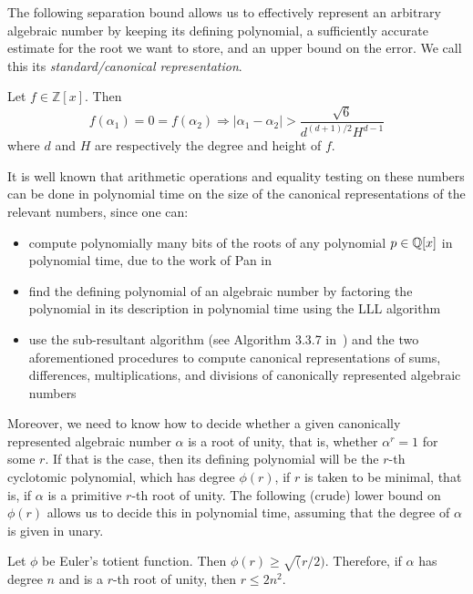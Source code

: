 The following separation bound allows us to effectively represent an arbitrary algebraic number by keeping its defining polynomial, a sufficiently accurate estimate for the root we want to store, and an upper bound on the error. We call this its \emph{standard/canonical representation}.

\begin{lemma}[Mignotte]
Let $f\in\mathbb{Z}[x]$. Then
\begin{equation}
f(\alpha_1)=0=f(\alpha_2)\Rightarrow \lvert \alpha_1-\alpha_2\rvert>\frac{\sqrt{6}}{d^{(d+1)/2}H^{d-1}}
\end{equation}
where $d$ and $H$ are respectively the degree and height of $f$.
\end{lemma}

It is well known that arithmetic operations and equality testing on these numbers can be done in polynomial time on the size of the canonical representations of the relevant numbers, since one can:
\begin{itemize}
\item compute polynomially many bits of the roots of any polynomial $p\in\mathbb{Q}[x]$ in polynomial time, due to the work of Pan in~\cite{Pan97}
\item find the defining polynomial of an algebraic number by factoring the polynomial in its description in polynomial time using the LLL algorithm~\cite{LenstraLenstraLovasz1982}
\item use the sub-resultant algorithm (see Algorithm 3.3.7 in~\cite{Coh93}) and the two aforementioned procedures to compute canonical representations of sums, differences, multiplications, and divisions of canonically represented algebraic numbers
\end{itemize}

Moreover, we need to know how to decide whether a given canonically represented algebraic number $\alpha$ is a root of unity, that is, whether $\alpha^r=1$ for some $r$. If that is the case, then its defining polynomial will be the $r$-th cyclotomic polynomial, which has degree $\phi(r)$, if $r$ is taken to be minimal, that is, if $\alpha$ is a primitive $r$-th root of unity. The following (crude) lower bound on $\phi(r)$ allows us to decide this in polynomial time, assuming that the degree of $\alpha$ is given in unary.

\begin{lemma}
Let $\phi$ be Euler's totient function. Then $\phi(r)\geq\sqrt(r/2)$. Therefore, if $\alpha$ has degree $n$ and is a $r$-th root of unity, then $r\leq 2n^2$.
\end{lemma}

